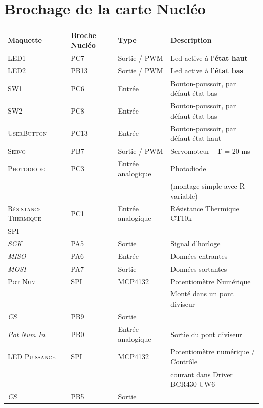\documentclass[a4paper,11pt,titlepage]{article} %
\begin{document}
\section{Brochage de la carte Nucléo}
\begin{center}

\begin{tabular}{|l|l|l|l|}
\hline 
Maquette & \textbf{Broche Nucléo} & Type & Description \\ 
\hline 
\textsc{LED1} & PC7 & Sortie / PWM & Led active à l'\textbf{état haut}\\ 
\textsc{LED2} & PB13 & Sortie / PWM & Led active à l'\textbf{état bas}\\ 
\hline 
\textsc{SW1} & PC6 & Entrée & Bouton-poussoir, par défaut état bas\\ 
\textsc{SW2} & PC8 & Entrée & Bouton-poussoir, par défaut état bas\\ 
\textsc{UserButton} & PC13 & Entrée & Bouton-poussoir, par défaut état haut\\
\hline 
\textsc{Servo} & PB7 & Sortie / PWM & Servomoteur - T = 20 ms\\ 
\hline 
\textsc{Photodiode} & PC3 & Entrée analogique & Photodiode \\
 & & & (montage simple avec R variable)\\ 
\hline 
\textsc{Résistance Thermique} & PC1 & Entrée analogique & Résistance Thermique CT10k\\ 
\hline 
\textsc{SPI} & & & \\ 
\textit{SCK} & PA5 & Sortie & Signal d'horloge\\
\textit{MISO} & PA6 & Entrée & Données entrantes\\
\textit{MOSI} & PA7 & Sortie & Données sortantes\\
\hline 
\textsc{Pot Num} & SPI & MCP4132 & Potentiomètre Numérique\\ 
 & & & Monté dans un pont diviseur\\ 
\textit{CS} & PB9 & Sortie & \\ 
\textit{Pot Num In} & PB0 & Entrée analogique & Sortie du pont diviseur\\ 
\hline 
\textsc{LED Puissance} & SPI & MCP4132 & Potentiomètre numérique / Contrôle\\ 
 & & & courant dans Driver BCR430-UW6\\ 
\textit{CS} & PB5 & Sortie & \\

\hline 
\end{tabular} 

\end{center}
\end{document}
